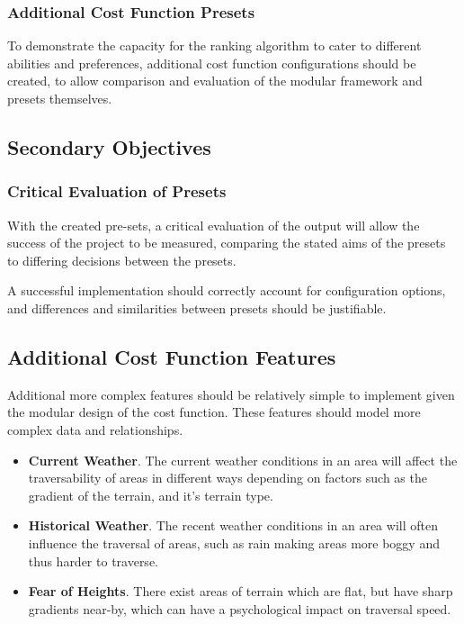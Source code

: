 \documentclass[12pt]{article}
\begin{document}
\subsubsection{Additional Cost Function Presets}

To demonstrate the capacity for the ranking algorithm to cater to different abilities and preferences, additional cost function configurations should be created, to allow comparison and evaluation of the modular framework and presets themselves.

\subsection{Secondary Objectives}

\subsubsection{Critical Evaluation of Presets}

With the created pre-sets, a critical evaluation of the output will allow the success of the project to be measured, comparing the stated aims of the presets to differing decisions between the presets.

A successful implementation should correctly account for configuration options, and differences and similarities between presets should be justifiable.

\subsection{Additional Cost Function Features}

Additional more complex features should be relatively simple to implement given the modular design of the cost function. These features should model more complex data and relationships.

\begin{itemize}
  \item \textbf{Current Weather}. The current weather conditions in an area will affect the traversability of areas in different ways depending on factors such as the gradient of the terrain, and it's terrain type.
  \item \textbf{Historical Weather}. The recent weather conditions in an area will often influence the traversal of areas, such as rain making areas more boggy and thus harder to traverse.
  \item \textbf{Fear of Heights}. There exist areas of terrain which are flat, but have sharp gradients near-by, which can have a psychological impact on traversal speed.
\end{itemize}
\end{document}
